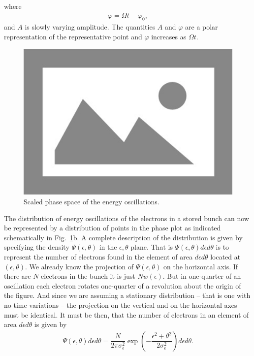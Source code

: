 where
\begin{align}
	\varphi = \Omega t - \varphi_0,
\end{align}
and $A$ is slowly varying amplitude. The quantities $A$ and $\varphi$ are a polar representation of the representative point and $\varphi$ increases as $\Omega t$.
\begin{figure}[!htb]
	\centering
	\includegraphics[width=0.8\linewidth]{./Figuras/placeholder.png}
	\caption{Scaled phase space of the energy oscillations.}
	\label{fig:fig44}
\end{figure}
The distribution of energy oscillations of the electrons in a stored bunch can now be represented
 by a distribution of points in the phase plot as indicated schematically in Fig.~\ref{fig:fig44}b. A complete description of the distribution is given by specifying the density $\Psi(\epsilon,\theta)$ in the $\epsilon,\theta$ plane. That is $\Psi(\epsilon,\theta) d\epsilon d\theta$ is to represent the number of electrons found in the element of area $d\epsilon d\theta$ located at $(\epsilon,\theta)$. We already know the projection of $\Psi(\epsilon,\theta)$ on the horizontal axis. If there are $N$ electrons in the bunch it is just $N w(\epsilon)$. But in one-quarter of an oscillation each electron rotates one-quarter of a revolution about the origin of the figure. And since we are assuming a stationary distribution
 -- that is one with no time variations -- the projection on the vertical and on the horizontal
 axes must be identical. It must be then, that the number of electrons in an element of area $d\epsilon d\theta$ is given by
\begin{align} \label{eq:5.57}
	\Psi(\epsilon,\theta)d\epsilon d\theta = \dfrac{N}{2\pi \sigma_\epsilon^2} \exp\left( -\dfrac{\epsilon^2 + \theta^2}{2\sigma_\epsilon^2} \right) d\epsilon d\theta.
\end{align}
